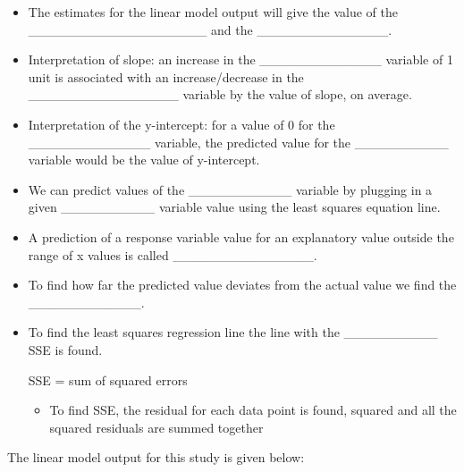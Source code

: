 \documentclass[
]{report}
\newenvironment{Shaded}{\begin{snugshade}}{\end{snugshade}}
\newcommand{\AttributeTok}[1]{\textcolor[rgb]{0.13,0.29,0.53}{#1}}
\newcommand{\CommentTok}[1]{\textcolor[rgb]{0.56,0.35,0.01}{\textit{#1}}}
\newcommand{\DecValTok}[1]{\textcolor[rgb]{0.00,0.00,0.81}{#1}}
\newcommand{\FunctionTok}[1]{\textcolor[rgb]{0.13,0.29,0.53}{\textbf{#1}}}
\newcommand{\NormalTok}[1]{#1}
\newcommand{\OtherTok}[1]{\textcolor[rgb]{0.56,0.35,0.01}{#1}}
\newcommand{\SpecialCharTok}[1]{\textcolor[rgb]{0.81,0.36,0.00}{\textbf{#1}}}
\providecommand{\tightlist}{%
  \setlength{\itemsep}{0pt}\setlength{\parskip}{0pt}}
\begin{document}

\begin{itemize}
\item
  The estimates for the linear model output will give the value of the \_\_\_\_\_\_\_\_\_\_\_\_\_\_\_\_\_\_\_ and the \_\_\_\_\_\_\_\_\_\_\_\_\_\_.
\item
  Interpretation of slope: an increase in the \_\_\_\_\_\_\_\_\_\_\_\_\_ variable of 1 unit is associated with an increase/decrease in the \_\_\_\_\_\_\_\_\_\_\_\_\_\_\_\_ variable by the value of slope, on average.
\item
  Interpretation of the y-intercept: for a value of 0 for the \_\_\_\_\_\_\_\_\_\_\_\_\_ variable, the predicted value for the \_\_\_\_\_\_\_\_\_\_ variable would be the value of y-intercept.
\item
  We can predict values of the \_\_\_\_\_\_\_\_\_\_\_ variable by plugging in a given \_\_\_\_\_\_\_\_\_\_ variable value using the least squares equation line.
\item
  A prediction of a response variable value for an explanatory value outside the range of x values is called \_\_\_\_\_\_\_\_\_\_\_\_\_\_\_.
\item
  To find how far the predicted value deviates from the actual value we find the \_\_\_\_\_\_\_\_\_\_\_\_.
\end{itemize}

\vspace{0.3in}

\begin{itemize}
\item
  To find the least squares regression line the line with the \_\_\_\_\_\_\_\_\_\_ SSE is found.

  SSE = sum of squared errors

  \begin{itemize}
  \tightlist
  \item
    To find SSE, the residual for each data point is found, squared and all the squared residuals are summed together
  \end{itemize}
\end{itemize}

The linear model output for this study is given below:

\begin{Shaded}
\end{Shaded}
\end{document}
